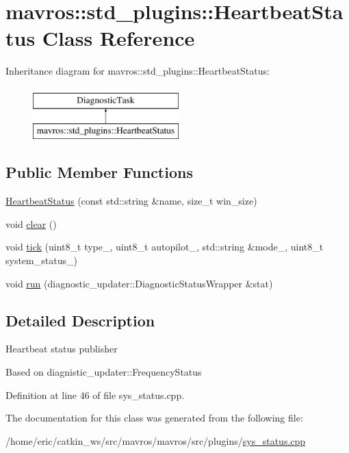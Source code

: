 \hypertarget{classmavros_1_1std__plugins_1_1HeartbeatStatus}{}\section{mavros\+::std\+\_\+plugins\+::Heartbeat\+Status Class Reference}
\label{classmavros_1_1std__plugins_1_1HeartbeatStatus}
Inheritance diagram for mavros\+::std\+\_\+plugins\+::Heartbeat\+Status\+:\begin{figure}[H]
\begin{center}
\leavevmode
\includegraphics[height=2.000000cm]{classmavros_1_1std__plugins_1_1HeartbeatStatus}
\end{center}
\end{figure}
\subsection*{Public Member Functions}
\begin{DoxyCompactItemize}
\item 
\mbox{\hyperlink{group__plugin_ga0039e2c63a99948b0ddc34d9a543d707}{Heartbeat\+Status}} (const std\+::string \&name, size\+\_\+t win\+\_\+size)
\item 
void \mbox{\hyperlink{group__plugin_gab6cb3f1f2eb5cf77a1efb3b9b82c0a4b}{clear}} ()
\item 
void \mbox{\hyperlink{group__plugin_ga3b9373356e08654bd08a28325ed4f24a}{tick}} (uint8\+\_\+t type\+\_\+, uint8\+\_\+t autopilot\+\_\+, std\+::string \&mode\+\_\+, uint8\+\_\+t system\+\_\+status\+\_\+)
\item 
void \mbox{\hyperlink{group__plugin_gaf1e9db0d3abf74c3025084c4a4dbae8a}{run}} (diagnostic\+\_\+updater\+::\+Diagnostic\+Status\+Wrapper \&stat)
\end{DoxyCompactItemize}


\subsection{Detailed Description}
Heartbeat status publisher

Based on diagnistic\+\_\+updater\+::\+Frequency\+Status 

Definition at line 46 of file sys\+\_\+status.\+cpp.



The documentation for this class was generated from the following file\+:\begin{DoxyCompactItemize}
\item 
/home/eric/catkin\+\_\+ws/src/mavros/mavros/src/plugins/\mbox{\hyperlink{sys__status_8cpp}{sys\+\_\+status.\+cpp}}\end{DoxyCompactItemize}
